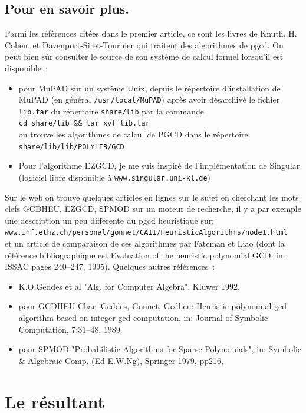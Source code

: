 \documentclass[a4paper,11pt]{book}
\begin{document}
\begin{giacjshere}
\section{Pour en savoir plus.}
Parmi les références citées dans le premier article, ce sont les livres de
Knuth, H. Cohen, et Davenport-Siret-Tournier qui traitent des algorithmes de
pgcd. On peut bien sûr consulter le source de son système de calcul formel
lorsqu'il est disponible~:
\begin{itemize}
\item pour MuPAD sur un système Unix, depuis le
répertoire d'installation de MuPAD (en général {\tt /usr/local/MuPAD})
après avoir désarchivé le fichier {\tt lib.tar} du répertoire {\tt share/lib} 
par la commande \\{\tt cd share/lib \&\& tar xvf lib.tar}\\ 
on trouve les  algorithmes de calcul de PGCD dans le répertoire \\
{\tt share/lib/lib/POLYLIB/GCD}
\item Pour l'algorithme EZGCD, je me suis inspiré de l'implémentation de 
Singular (logiciel libre disponible à {\tt www.singular.uni-kl.de})
\end{itemize}
Sur le web on trouve quelques articles en lignes sur le
sujet en cherchant les mots clefs GCDHEU, EZGCD, SPMOD sur un moteur de 
recherche, il y a par exemple une description un peu différente du pgcd
heuristique sur:\\
{\tt www.inf.ethz.ch/personal/gonnet/CAII/HeuristicAlgorithms/node1.html}\\
et un article de comparaison de ces algorithmes 
par Fateman et Liao (dont la référence bibliographique est
Evaluation of the heuristic polynomial GCD.
in: ISSAC pages 240--247, 1995). Quelques autres références~:
\begin{itemize}
\item K.O.Geddes et al "Alg. for Computer Algebra", Kluwer 1992.
\item pour GCDHEU Char, Geddes, Gonnet, 
Gcdheu: Heuristic polynomial gcd algorithm based on integer gcd computation,
in: Journal of Symbolic Computation, 7:31--48, 1989.
\item pour SPMOD "Probabilistic Algorithms for Sparse Polynomials",
in: Symbolic \& Algebraic Comp. (Ed E.W.Ng), Springer 1979, pp216,
\end{itemize}


\chapter{Le résultant} \label{sec:resultant} 

\end{giacjshere}
\end{document}
